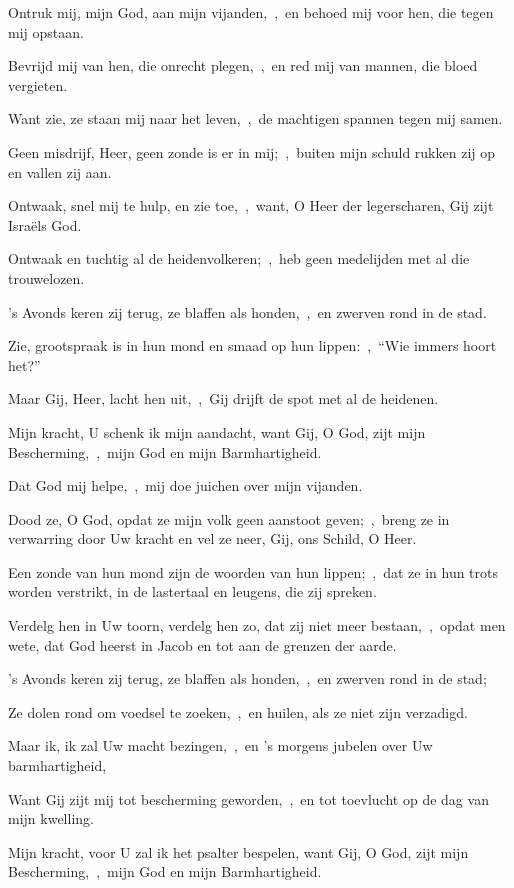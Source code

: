 \documentclass[12pt,twoside,a5paper]{article}
\begin{document}

\begin{halfparskip}
  Ontruk mij, mijn God, aan mijn vijanden,~\sep\ en behoed mij voor hen, die tegen mij opstaan.


  Bevrijd mij van hen, die onrecht plegen,~\sep\ en red mij van mannen, die bloed vergieten.

  Want zie, ze staan mij naar het leven,~\sep\ de machtigen spannen tegen mij samen.

  Geen misdrijf, Heer, geen zonde is er in mij;~\sep\ buiten mijn schuld rukken zij op en vallen zij aan.

  Ontwaak, snel mij te hulp, en zie toe,~\sep\ want, O Heer der legerscharen, Gij zijt Israëls God.

  Ontwaak en tuchtig al de heidenvolkeren;~\sep\ heb geen medelijden met al die trouwelozen.

  's Avonds keren zij terug, ze blaffen als honden,~\sep\ en zwerven rond in de stad.

  Zie, grootspraak is in hun mond en smaad op hun lippen:~\sep\ ``Wie immers hoort het?''

  Maar Gij, Heer, lacht hen uit,~\sep\ Gij drijft de spot met al de heidenen.

  Mijn kracht, U schenk ik mijn aandacht, want Gij, O God, zijt mijn Bescherming,~\sep\ mijn God en mijn Barmhartigheid.
\end{halfparskip}


\begin{halfparskip}
  Dat God mij helpe,~\sep\ mij doe juichen over mijn vijanden.

  Dood ze, O God, opdat ze mijn volk geen aanstoot geven;~\sep\ breng ze in verwarring door Uw kracht en vel ze neer, Gij, ons Schild, O Heer.

  Een zonde van hun mond zijn de woorden van hun lippen;~\sep\ dat ze in hun trots worden verstrikt, in de lastertaal en leugens, die zij spreken.

  Verdelg hen in Uw toorn, verdelg hen zo, dat zij niet meer bestaan,~\sep\ opdat men wete, dat God heerst in Jacob en tot aan de grenzen der aarde.

  's Avonds keren zij terug, ze blaffen als honden,~\sep\ en zwerven rond in de stad;

  Ze dolen rond om voedsel te zoeken,~\sep\ en huilen, als ze niet zijn verzadigd.

  Maar ik, ik zal Uw macht bezingen,~\sep\ en 's morgens jubelen over Uw barmhartigheid,

  Want Gij zijt mij tot bescherming geworden,~\sep\ en tot toevlucht op de dag van mijn kwelling.

  Mijn kracht, voor U zal ik het psalter bespelen, want Gij, O God, zijt mijn Bescherming,~\sep\ mijn God en mijn Barmhartigheid.
\end{halfparskip}
\end{document}
